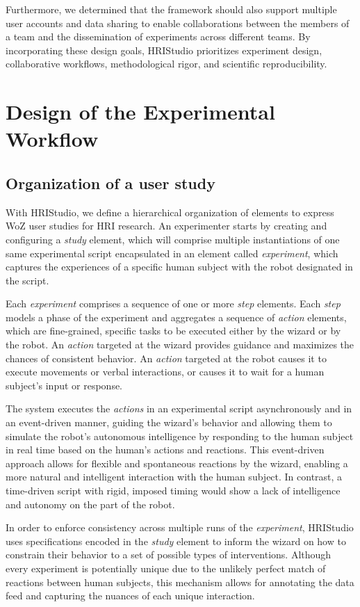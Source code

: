 \documentclass[letterpaper, 10 pt, conference]{ieeeconf}
\begin{document}
Furthermore, we determined that the framework should also support multiple user accounts and data sharing to enable collaborations between the members of a team and the dissemination of experiments across different teams. By incorporating these design goals, HRIStudio prioritizes experiment design, collaborative workflows, methodological rigor, and scientific reproducibility.

\section{Design of the Experimental Workflow}

\subsection{Organization of a user study}

With HRIStudio, we define a hierarchical organization of elements to express WoZ user studies for HRI research. An experimenter starts by creating and configuring a \emph{study} element, which will comprise multiple instantiations of one same experimental script encapsulated in an element called \emph{experiment}, which captures the experiences of a specific human subject with the robot designated in the script. 

Each \emph{experiment} comprises a sequence of one or more \emph{step} elements. Each \emph{step} models a phase of the experiment and aggregates a sequence of \emph{action} elements, which are fine-grained, specific tasks to be executed either by the wizard or by the robot. An \emph{action} targeted at the wizard provides guidance and maximizes the chances of consistent behavior. An \emph{action} targeted at the robot causes it to execute movements or verbal interactions, or causes it to wait for a human subject's input or response.

The system executes the \emph{actions} in an experimental script asynchronously and in an event-driven manner, guiding the wizard's behavior and allowing them to simulate the robot's autonomous intelligence by responding to the human subject in real time based on the human's actions and reactions. This event-driven approach allows for flexible and spontaneous reactions by the wizard, enabling a more natural and intelligent interaction with the human subject. In contrast, a time-driven script with rigid, imposed timing would show a lack of intelligence and autonomy on the part of the robot.

In order to enforce consistency across multiple runs of the \emph{experiment}, HRIStudio uses specifications encoded in the \emph{study} element to inform the wizard on how to constrain their behavior to a set of possible types of interventions. Although every experiment is potentially unique due to the unlikely perfect match of reactions between human subjects, this mechanism allows for annotating the data feed and capturing the nuances of each unique interaction.
\end{document}
